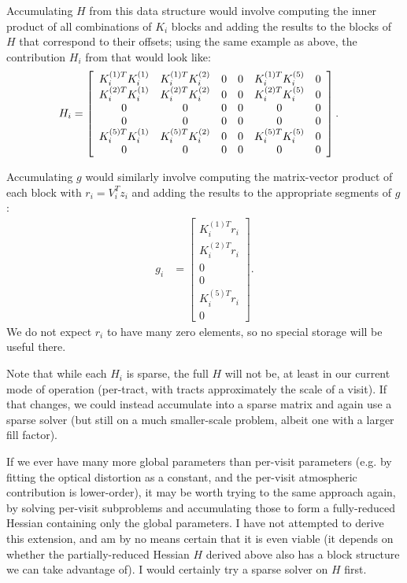Accumulating $H$ from this data structure would involve computing the inner product of all combinations of $K_i$ blocks and adding the results to the blocks of $H$ that correspond to their offsets; using the same example as above, the contribution $H_i$ from that  would look like:
\begin{align}
    H_i &= \left[
        \begin{array}{ c c c c c c }
            K_i^{(1) T} K_i^{(1)} & K_i^{(1) T} K_i^{(2)} & 0 & 0 & K_i^{(1) T} K_i^{(5)} & 0 \\
            K_i^{(2) T} K_i^{(1)} & K_i^{(2) T} K_i^{(2)} & 0 & 0 & K_i^{(2) T} K_i^{(5)} & 0 \\
            0 & 0 & 0 & 0 & 0 & 0 \\
            0 & 0 & 0 & 0 & 0 & 0 \\
            K_i^{(5) T} K_i^{(1)} & K_i^{(5) T} K_i^{(2)} & 0 & 0 & K_i^{(5) T} K_i^{(5)} & 0 \\
            0 & 0 & 0 & 0 & 0 & 0
        \end{array}
    \right].
\end{align}

Accumulating $g$ would similarly involve computing the matrix-vector product of each block with $r_i = V_i^T z_i$ and adding the results to the appropriate segments of $g$:
\begin{align}
    g_i &= \left[
        \begin{array}{ c }
            K_i^{(1) T} r_i \\
            K_i^{(2) T} r_i \\
            0 \\
            0 \\
            K_i^{(5) T} r_i \\
            0
        \end{array}
    \right].
\end{align}
We do not expect $r_i$ to have many zero elements, so no special storage will be useful there.

Note that while each $H_i$ is sparse, the full $H$ will not be, at least in our current mode of operation (per-tract, with tracts approximately the scale of a visit).
If that changes, we could instead accumulate into a sparse matrix and again use a sparse solver (but still on a much smaller-scale problem, albeit one with a larger fill factor).

If we ever have many more global parameters than per-visit parameters (e.g. by fitting the optical distortion as a constant, and the per-visit atmospheric contribution is lower-order), it may be worth trying to the same approach again, by solving per-visit subproblems and accumulating those to form a fully-reduced Hessian containing only the global parameters.
I have not attempted to derive this extension, and am by no means certain that it is even viable (it depends on whether the partially-reduced Hessian $H$ derived above also has a block structure we can take advantage of).
I would certainly try a sparse solver on $H$ first.

